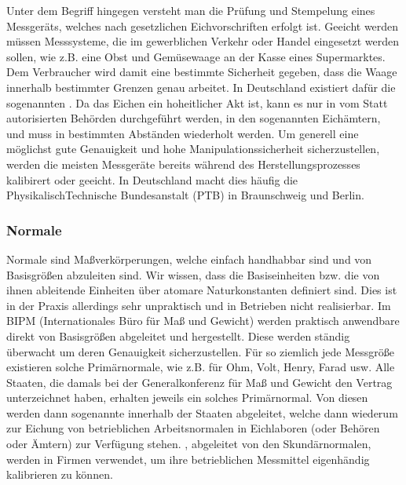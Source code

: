 \documentclass[letterpaper,10pt,english]{jupyterBook}
\begin{document}
\sphinxAtStartPar
Unter dem Begriff  hingegen versteht man die Prüfung und Stempelung eines Messgeräts, welches nach gesetzlichen Eichvorschriften erfolgt ist. Geeicht werden müssen Messsysteme, die im gewerblichen Verkehr oder Handel eingesetzt werden sollen, wie z.B. eine Obst\sphinxhyphen{} und Gemüsewaage an der Kasse eines Supermarktes. Dem Verbraucher wird damit eine bestimmte Sicherheit gegeben, dass die Waage \sphinxhyphen{} innerhalb bestimmter Grenzen \sphinxhyphen{} genau arbeitet. In Deutschland existiert dafür die sogenannten .
Da das Eichen ein hoheitlicher Akt ist, kann es nur in vom Statt autorisierten Behörden durchgeführt werden, in den sogenannten Eichämtern, und muss in bestimmten Abständen wiederholt werden. Um generell eine möglichst gute Genauigkeit und hohe Manipulationssicherheit sicherzustellen, werden die meisten Messgeräte bereits während des Herstellungsprozesses kalibirert oder geeicht. In Deutschland macht dies häufig die Physikalisch\sphinxhyphen{}Technische Bundesanstalt (PTB) in Braunschweig und Berlin.


\subsubsection{Normale}
\label{\detokenize{content/0_Basics:normale}}
\sphinxAtStartPar


\sphinxAtStartPar
Normale sind Maßverkörperungen, welche einfach handhabbar sind und von Basisgrößen abzuleiten sind.
Wir wissen, dass die Basiseinheiten \sphinxhyphen{} bzw. die von ihnen ableitende Einheiten \sphinxhyphen{} über atomare Naturkonstanten definiert sind. Dies ist in der Praxis allerdings sehr unpraktisch und in Betrieben nicht realisierbar.
Im BIPM (Internationales Büro für Maß und Gewicht) werden praktisch anwendbare  direkt von Basisgrößen abgeleitet und hergestellt. Diese werden ständig überwacht um deren Genauigkeit sicherzustellen. Für so ziemlich jede Messgröße existieren solche Primärnormale, wie z.B. für Ohm, Volt, Henry, Farad usw.
Alle Staaten, die damals bei der Generalkonferenz für Maß und Gewicht den Vertrag unterzeichnet haben, erhalten jeweils ein solches Primärnormal. Von diesen werden dann sogenannte  innerhalb der Staaten abgeleitet, welche dann wiederum zur Eichung von betrieblichen Arbeitsnormalen in Eichlaboren (oder Behören oder Ämtern) zur Verfügung stehen.
, abgeleitet von den Skundärnormalen, werden in Firmen verwendet, um ihre betrieblichen Messmittel eigenhändig kalibrieren zu können.
\end{document}
